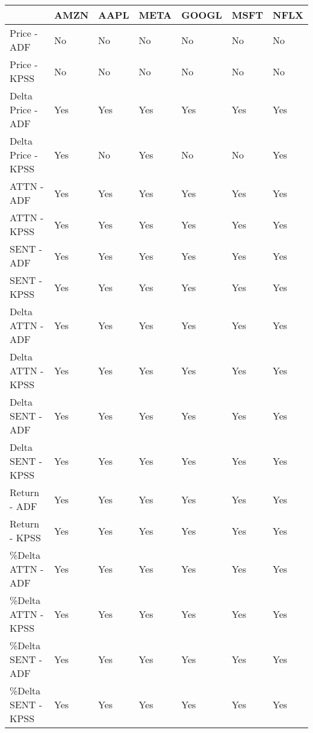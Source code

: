 \begin{tabular}{lllllll}
\toprule
{} & AMZN & AAPL & META & GOOGL & MSFT & NFLX \\
\midrule
Price - ADF        &   No &   No &   No &    No &   No &   No \\
Price - KPSS       &   No &   No &   No &    No &   No &   No \\
Delta Price - ADF  &  Yes &  Yes &  Yes &   Yes &  Yes &  Yes \\
Delta Price - KPSS &  Yes &   No &  Yes &    No &   No &  Yes \\
ATTN - ADF         &  Yes &  Yes &  Yes &   Yes &  Yes &  Yes \\
ATTN - KPSS        &  Yes &  Yes &  Yes &   Yes &  Yes &  Yes \\
SENT - ADF         &  Yes &  Yes &  Yes &   Yes &  Yes &  Yes \\
SENT - KPSS        &  Yes &  Yes &  Yes &   Yes &  Yes &  Yes \\
Delta ATTN - ADF   &  Yes &  Yes &  Yes &   Yes &  Yes &  Yes \\
Delta ATTN - KPSS  &  Yes &  Yes &  Yes &   Yes &  Yes &  Yes \\
Delta SENT - ADF   &  Yes &  Yes &  Yes &   Yes &  Yes &  Yes \\
Delta SENT - KPSS  &  Yes &  Yes &  Yes &   Yes &  Yes &  Yes \\
Return - ADF       &  Yes &  Yes &  Yes &   Yes &  Yes &  Yes \\
Return - KPSS      &  Yes &  Yes &  Yes &   Yes &  Yes &  Yes \\
\%Delta ATTN - ADF  &  Yes &  Yes &  Yes &   Yes &  Yes &  Yes \\
\%Delta ATTN - KPSS &  Yes &  Yes &  Yes &   Yes &  Yes &  Yes \\
\%Delta SENT - ADF  &  Yes &  Yes &  Yes &   Yes &  Yes &  Yes \\
\%Delta SENT - KPSS &  Yes &  Yes &  Yes &   Yes &  Yes &  Yes \\
\bottomrule
\end{tabular}
